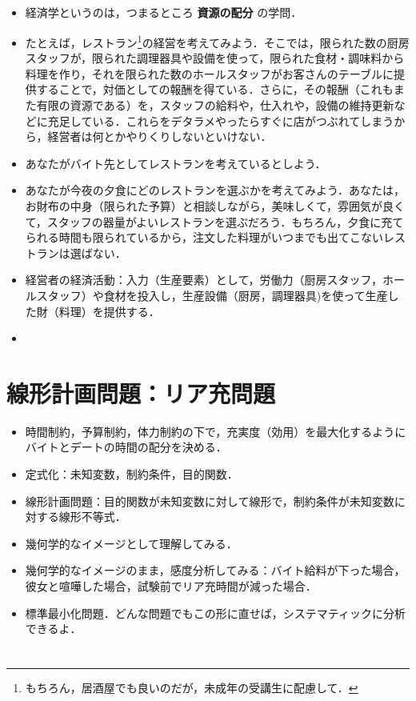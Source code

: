 \documentclass[platex,12pt,a4paper]{jsarticle}
\begin{document}
\subsection{}
\label{sec:orgc50daa0}
\subsection{}
\label{sec:org5a3350f}
\begin{itemize}
\item 経済学というのは，つまるところ \textbf{\textbf{資源の配分}} の学問．
\item たとえば，レストラン\footnote{もちろん，居酒屋でも良いのだが，未成年の受講生に配慮して．}の経営を考えてみよう．そこでは，限られた数の厨房スタッフが，限られた調理器具や設備を使って，限られた食材・調味料から料理を作り，それを限られた数のホールスタッフがお客さんのテーブルに提供することで，対価としての報酬を得ている．さらに，その報酬（これもまた有限の資源である）を，スタッフの給料や，仕入れや，設備の維持更新などに充足している．これらをデタラメやったらすぐに店がつぶれてしまうから，経営者は何とかやりくりしないといけない．
\item あなたがバイト先としてレストランを考えているとしよう．
\item あなたが今夜の夕食にどのレストランを選ぶかを考えてみよう．あなたは，お財布の中身（限られた予算）と相談しながら，美味しくて，雰囲気が良くて，スタッフの器量がよいレストランを選ぶだろう．もちろん，夕食に充てられる時間も限られているから，注文した料理がいつまでも出てこないレストランは選ばない．
\item 経営者の経済活動：入力（生産要素）として，労働力（厨房スタッフ，ホールスタッフ）や食材を投入し，生産設備（厨房，調理器具)を使って生産した財（料理）を提供する．
\item 
\end{itemize}
\section{線形計画問題：リア充問題}
\label{sec:orgbd6bd1f}
\begin{itemize}
\item 時間制約，予算制約，体力制約の下で，充実度（効用）を最大化するようにバイトとデートの時間の配分を決める．
\item 定式化：未知変数，制約条件，目的関数．
\item 線形計画問題：目的関数が未知変数に対して線形で，制約条件が未知変数に対する線形不等式．
\item 幾何学的なイメージとして理解してみる．
\item 幾何学的なイメージのまま，感度分析してみる：バイト給料が下った場合，彼女と喧嘩した場合，試験前でリア充時間が減った場合．
\item 標準最小化問題．どんな問題でもこの形に直せば，システマティックに分析できるよ．
\end{itemize}

\section{}
\label{sec:org1332e01}

\section{}
\label{sec:org52d636a}
\end{document}
